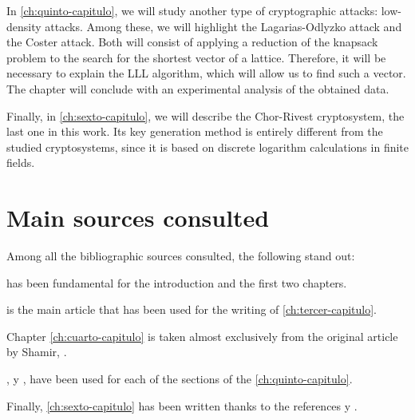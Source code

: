 In \autoref{ch:quinto-capitulo}, we will study another type of cryptographic attacks: low-density attacks. Among these, we will highlight the Lagarias-Odlyzko attack and the Coster attack. Both will consist of applying a reduction of the knapsack problem to the search for the shortest vector of a lattice. Therefore, it will be necessary to explain the LLL algorithm, which will allow us to find such a vector. The chapter will conclude with an experimental analysis of the obtained data.

Finally, in \autoref{ch:sexto-capitulo}, we will describe the Chor-Rivest cryptosystem, the last one in this work. Its key generation method is entirely different from the studied cryptosystems, since it is based on discrete logarithm calculations in finite fields.

\section*{Main sources consulted}

Among all the bibliographic sources consulted, the following stand out:

\cite{cryptoSchool} has been fundamental for the introduction and the first two chapters.

\cite{artMH} is the main article that has been used for the writing of \autoref{ch:tercer-capitulo}.

Chapter \ref{ch:cuarto-capitulo} is taken almost exclusively from the original article by Shamir, \cite{artSha}.

\cite{artLLL}, \cite{artLagOdl} y \cite{artCoster}, have been used for each of the sections of the \autoref{ch:quinto-capitulo}.

Finally, \autoref{ch:sexto-capitulo} has been written thanks to the references \cite{artChorRivest} y \cite{artQuanChorRivest}.

\endinput
